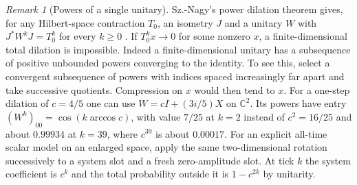 \documentclass[aps,pra,onecolumn,superscriptaddress,nofootinbib,10pt]{revtex4-2}
\theoremstyle{definition}
\theoremstyle{remark}
\newtheorem{remark}[theorem]{Remark}
\newcommand{\C}{\mathbb{C}}
\begin{document}
\begin{remark}[Powers of a single unitary]\label{ob:dilation}
Sz.-Nagy's power dilation theorem gives, for any Hilbert-space
contraction $T_0$, an isometry $J$ and a unitary $W$ with
$J^*W^kJ=T_0^k$ for every $k\ge0$
\cite{obr:sznagy}. If $T_0^kx\to0$ for some nonzero $x$,
a finite-dimensional total dilation is impossible.
Indeed a finite-dimensional unitary has a subsequence of positive
unbounded powers converging to the identity. To see this, select a
convergent subsequence of powers with indices spaced increasingly
far apart and take successive quotients. Compression on $x$ would
then tend to $x$. For a one-step dilation of $c=4/5$ one can use
$W=cI+(3i/5)X$ on $\C^2$. Its powers have entry
$(W^k)_{00}=\cos(k\arccos c)$, with value $7/25$ at $k=2$ instead of
$c^2=16/25$ and about $0.99934$ at $k=39$, where $c^{39}$ is about
$0.00017$. For an explicit all-time scalar model on an enlarged
space, apply the same two-dimensional rotation successively to
a system slot and a fresh zero-amplitude slot. At tick $k$
the system coefficient is $c^k$ and the total probability outside
it is $1-c^{2k}$ by unitarity.
\end{remark}
\end{document}
